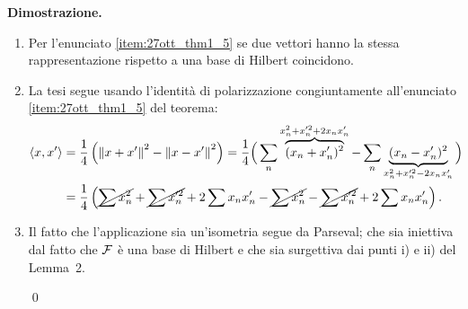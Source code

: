 \vs 

\textbf{Dimostrazione.}

\begin{enumerate}
	\item Per l'enunciato \ref{item:27ott_thm1_5} se due vettori hanno la stessa rappresentazione rispetto a una base di Hilbert coincidono.

	\item La tesi segue usando l'identità di polarizzazione congiuntamente all'enunciato \ref{item:27ott_thm1_5} del teorema:
	\begin{align*}
		\left<x,x' \right> & = \frac{1}{4} \left( \left\lVert x + x' \right\rVert^2 - \left\lVert x - x' \right\rVert^2 \right)
		= \frac{1}{4} \Big( \sum_n \overbrace{(x_n + x_n')^2}^{x_n^2 + x_n'^2 + 2x_n x_n'} - \sum_n \underbrace{(x_n - x_n')^2}_{x_n^2 + x_n'^2 - 2 x_n x_n'}  \Big) \\
		& = \frac{1}{4} \left( \cancel{\sum x_n^2} + \cancel{\sum x_n'^2} + 2 \sum x_n x_n' - \cancel{\sum x_n^2} - \cancel{\sum x_n'^2} + 2 \sum x_n x_n' \right).
	\end{align*}

	\item Il fatto che l'applicazione sia un'isometria segue da Parseval; che sia iniettiva dal fatto che $\mathcal{F}$ è una base di Hilbert e che sia surgettiva dai punti i) e ii) del Lemma~2.

	\qed
\end{enumerate}

